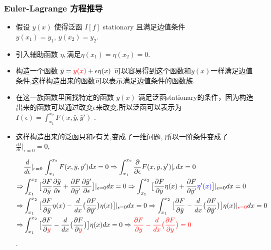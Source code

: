 \documentclass[UTF8, aspectratio=169, 10pt]{ctexbeamer}
\begin{document}
\begin{frame}
  \frametitle{Euler-Lagrange 方程推导}
  \begin{itemize}
  \item 假设 $y(x)$ 使得泛函 $I[f]$ stationary 且满足边值条件 $y(x_1) = y_1, \, y(x_2) = y_2$.
  \item 引入辅助函数 $\eta, 满足 \eta (x_1) = \eta (x_2) = 0$.
  \item 构造一个函数 $\bar{y} = \textcolor{red} {y(x)} + \epsilon \eta(x)$ 可以容易得到这个函数和$y(x)$一样满足边值条件,这样构造出来的函数可以表示满足边值条件的函数族.
  \item 在这一族函数里面找特定的函数 $\bar{y} (x)$ 满足泛函stationary的条件，因为构造出来的函数可以通过改变$\epsilon$来改变,所以泛函可以表示为 $I( \epsilon ) =
    \int_{x_1}^{x_2} F( x, \bar{y}, \bar{y}' )$ .
  \item 这样构造出来的泛函只和$\epsilon$有关,变成了一维问题, 所以一阶条件变成了
    $\frac{dI}{d \epsilon} |_{\epsilon = 0} = 0$,

    \begin{align}
      \begin{split}
        & \frac{d}{d \epsilon} |_{\epsilon = 0} \, \int_{x_1}^{x_2} F(x,
        \bar{y}, \bar{y}' ) dx = 0 \Rightarrow \int_{x_1}^{x_2}
        \frac{\partial}{\partial
          \epsilon} F( x, \bar{y}, \bar{y}' ) |_{\epsilon} dx = 0 \\
        \Rightarrow & \int_{x_1}^{x_2} \big [ \frac{ \partial F }{ \partial
          \bar{y} } \frac{ \partial \bar{y} }{ \partial \epsilon } + \frac{
          \partial F }{ \partial \bar{y}' } \frac{ \partial \bar{y}' }{ \partial
          \epsilon } \big ] |_{\epsilon=0} dx = 0
        \Rightarrow  \int_{x_1}^{x_2} \big [ \frac{ \partial F }{ \partial
          \bar{y} } \eta (x) + \frac{
          \partial F }{ \partial \bar{y}' } \textcolor {blue} {\eta'(x)} \big ] |_{\epsilon=0} dx =
        0 \\
        \Rightarrow & \int_{x_1}^{x_2} \big [ \frac{ \partial F }{ \partial
          \bar{y} } \eta (x) - \frac{d}{dx} \big ( \frac{
          \partial F }{ \partial \bar{y}' } \big ) \eta(x) \big ] |_{\epsilon=0} dx =
        0
        \Rightarrow  \int_{x_1}^{x_2} \big [ \frac{ \partial F }{ \partial
          \bar{y} }  - \frac{d}{dx} \big ( \frac{
          \partial F }{ \partial \bar{y}' } \big )  \big ] \eta(x) |_{\textcolor
          {red} {\epsilon=0} } dx =
        0  \\
        \Rightarrow & \int_{x_1}^{x_2} \big [ \frac{ \partial F }{ \partial
          \textcolor {red} {y} }  - \frac{d}{dx} \big ( \frac{
          \partial F }{ \partial \textcolor {red} {y} } \big )  \big ] \eta(x)  dx =
        0
        \Rightarrow \textcolor[rgb]{1.00,0.00,0.00}{ \frac{ \partial F }{ \partial
          {y} }  - \frac{d}{dx} \big ( \frac{
          \partial F }{ \partial  {y} } \big )  = 0 }
      \end{split}
    \end{align}.

  \end{itemize}
\end{frame}
\end{document}
